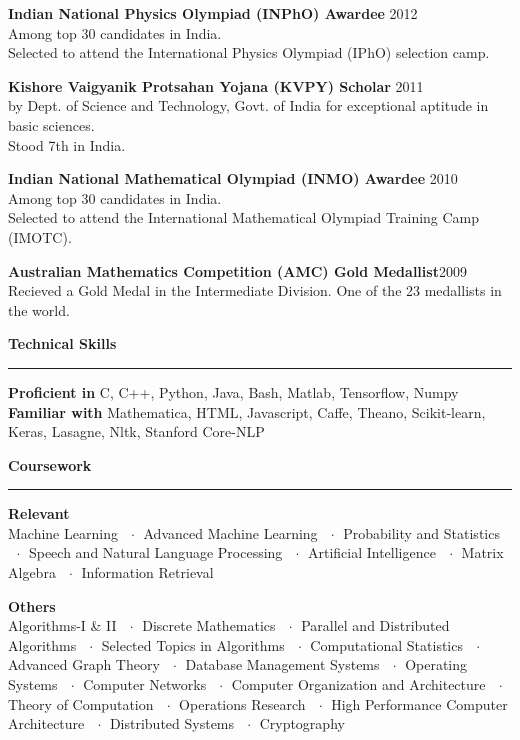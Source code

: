 \documentclass[10pt]{article}
\newcommand{\heading}[1]{
 {\large \textbf{#1}}
  \vspace{0.4em}
  \hrule
  \vspace{0.4em}
}
\newcommand{\EntryGap}{\vspace{0.5cm}}
\newcommand{\SmallEntryGap}{\vspace{0.2cm}}
\newcommand{\mdot}{$\ \ \cdot\ \ $}
\begin{document}
 \textbf{Indian National Physics Olympiad (INPhO) Awardee} \hfill 2012\\
  Among top 30 candidates in India.\\
  Selected to attend the 
  International Physics Olympiad (IPhO) selection camp.
  \SmallEntryGap
  
 \textbf{Kishore Vaigyanik Protsahan Yojana (KVPY) Scholar} \hfill 2011\\
  by Dept. of Science and Technology, Govt. of India for exceptional aptitude in basic sciences.\\
  Stood 7th in India.
  \SmallEntryGap
  
 \textbf{Indian National Mathematical Olympiad (INMO) Awardee} \hfill 2010\\
  Among top 30 candidates in India.\\
  Selected to attend the International Mathematical Olympiad Training Camp (IMOTC).
  \SmallEntryGap
  
 \textbf{Australian Mathematics Competition (AMC) Gold Medallist}\hfill 2009\\
  Recieved a Gold Medal in the Intermediate Division. One of the 23 medallists in the world.




\EntryGap
\heading{Technical Skills}
\SmallEntryGap
\textbf{Proficient in} C, C++, Python, Java, Bash, Matlab, Tensorflow, Numpy\\
\textbf{Familiar with} Mathematica, HTML, Javascript, Caffe, Theano, Scikit-learn,\\
Keras, Lasagne, Nltk, Stanford Core-NLP





\EntryGap
\heading{Coursework}
\SmallEntryGap
\textbf{Relevant}\\
Machine Learning \mdot Advanced Machine Learning \mdot Probability and Statistics \mdot Speech and Natural Language Processing 
\mdot Artificial Intelligence \mdot Matrix Algebra \mdot Information Retrieval

\SmallEntryGap
\textbf{Others}\\
Algorithms-I \& II \mdot Discrete Mathematics \mdot Parallel and Distributed Algorithms 
\mdot Selected Topics in Algorithms  \mdot Computational Statistics
\mdot Advanced Graph Theory \mdot Database Management Systems \mdot Operating Systems
\mdot Computer Networks \mdot Computer Organization and Architecture \mdot Theory of Computation
\mdot Operations Research \mdot High Performance Computer Architecture \mdot Distributed Systems
\mdot Cryptography
\end{document}
